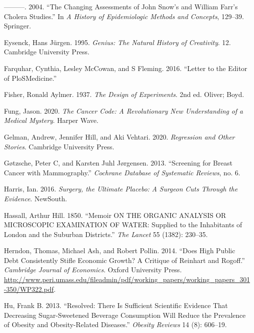 \documentclass[
  10pt,
  b5paper]{book}
\newlength{\cslhangindent}
\newlength{\cslentryspacingunit} %
\newenvironment{CSLReferences}[2] %
 {%
  \setlength{\parindent}{0pt}
  \ifodd #1
  \let\oldpar\par
  \def\par{\hangindent=\cslhangindent\oldpar}
  \fi
  \setlength{\parskip}{#2\cslentryspacingunit}
 }%
 {}
\begin{document}
\begin{CSLReferences}{1}{0}
\leavevmode{}%
---------. 2004. {``The Changing Assessments of John Snow's and William Farr's Cholera Studies.''} In \emph{A History of Epidemiologic Methods and Concepts}, 129--39. Springer.

\leavevmode{}%
Eysenck, Hans Jürgen. 1995. \emph{Genius: The Natural History of Creativity}. 12. Cambridge University Press.

\leavevmode{}%
Farquhar, Cynthia, Lesley McCowan, and S Fleming. 2016. {``Letter to the Editor of PloSMedicine.''}

\leavevmode{}%
Fisher, Ronald Aylmer. 1937. \emph{The Design of Experiments}. 2nd ed. Oliver; Boyd.

\leavevmode{}%
Fung, Jason. 2020. \emph{The Cancer Code: A Revolutionary New Understanding of a Medical Mystery}. Harper Wave.

\leavevmode{}%
Gelman, Andrew, Jennifer Hill, and Aki Vehtari. 2020. \emph{Regression and Other Stories}. Cambridge University Press.

\leavevmode{}%
Gøtzsche, Peter C, and Karsten Juhl Jørgensen. 2013. {``Screening for Breast Cancer with Mammography.''} \emph{Cochrane Database of Systematic Reviews}, no. 6.

\leavevmode{}%
Harris, Ian. 2016. \emph{Surgery, the Ultimate Placebo: A Surgeon Cuts Through the Evidence}. NewSouth.

\leavevmode{}%
Hassall, Arthur Hill. 1850. {``Memoir ON THE ORGANIC ANALYSIS OR MICROSCOPIC EXAMINATION OF WATER: Supplied to the Inhabitants of London and the Suburban Districts.''} \emph{The Lancet} 55 (1382): 230--35.

\leavevmode{}%
Herndon, Thomas, Michael Ash, and Robert Pollin. 2014. {``Does High Public Debt Consistently Stifle Economic Growth? A Critique of Reinhart and Rogoff.''} \emph{Cambridge Journal of Economics}. Oxford University Press. \url{http://www.peri.umass.edu/fileadmin/pdf/working_papers/working_papers_301-350/WP322.pdf}.

\leavevmode{}%
Hu, Frank B. 2013. {``Resolved: There Is Sufficient Scientific Evidence That Decreasing Sugar-Sweetened Beverage Consumption Will Reduce the Prevalence of Obesity and Obesity-Related Diseases.''} \emph{Obesity Reviews} 14 (8): 606--19.


\end{CSLReferences}
\end{document}
